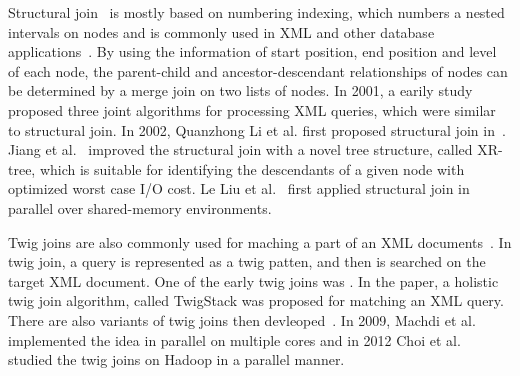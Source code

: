 Structural join~\cite{AlJYK02} is mostly based on numbering
indexing\cite{numbering}, which numbers a nested intervals on nodes and is
commonly used in XML and other database
applications~\cite{ZNDI01,HAJR03,ZNDI01}. By using the information of start
position, end position and level of each node, the parent-child and
ancestor-descendant relationships of nodes can be determined by a merge join on
two lists of nodes. In 2001, a earily study~\cite{LiMo01} proposed three joint
algorithms for processing XML queries, which were similar to structural join. In
2002, Quanzhong Li et al. first proposed structural join in~\cite{AlJYK02}.
Jiang et al.~\cite{JLWO03} improved the structural join with a novel tree
structure, called XR-tree, which is suitable for identifying the descendants of
a given node with optimized worst case I/O cost. Le Liu et al.~\cite{LFLQ08}
first applied structural join in parallel over shared-memory environments.

Twig joins are also commonly used for maching a part of an XML
documents~\cite{jiang2003holistic,lu2005efficient,lu2005tjfast,
	fontoura2005optimizing}. In twig join, a query is represented as a twig patten,
and then is searched on the target XML document. One of the early twig joins was
\cite{BrKS02}. In the paper, a holistic twig join algorithm, called TwigStack
was proposed for matching an XML query. There are also variants of twig joins
then devleoped~\cite{CLTH06,QiYD07}. In 2009, Machdi et al.~\cite{MaAK09}
implemented the idea in parallel on multiple cores and in 2012 Choi et
al.~\cite{CLKL12} studied the twig joins on Hadoop in a parallel manner.


